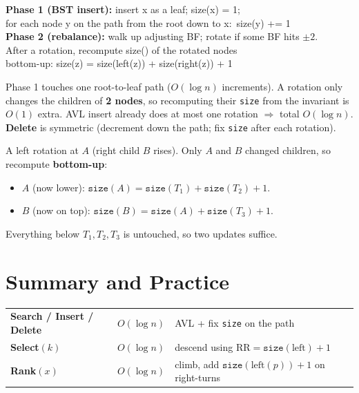 \documentclass[11pt]{article}
\begin{document}
\begin{codebox}
\ttfamily \textbf{Phase 1 (BST insert):} insert x as a leaf; size(x) = 1;\\
\ttfamily \hspace*{2em}for each node y on the path from the root down to x:\, size(y) += 1\\[3pt]
\ttfamily \textbf{Phase 2 (rebalance):} walk up adjusting BF; rotate if some BF hits $\pm 2$.\\
\ttfamily \hspace*{2em}After a rotation, recompute size() of the rotated nodes\\
\ttfamily \hspace*{2em}bottom-up: size(z) = size(left(z)) + size(right(z)) + 1
\end{codebox}

\begin{keybox}
Phase 1 touches one root-to-leaf path ($O(\log n)$ increments). A rotation only changes the children of \textbf{2 nodes}, so recomputing their \texttt{size} from the invariant is \textcolor{greenO}{$O(1)$} extra. AVL insert already does at most one rotation $\Rightarrow$ total \textcolor{violetT}{$O(\log n)$}. \textbf{Delete} is symmetric (decrement down the path; fix \texttt{size} after each rotation).
\end{keybox}

\begin{examplebox}
A left rotation at $A$ (right child $B$ rises). Only $A$ and $B$ changed children, so recompute \textbf{bottom-up}:
\begin{itemize}[leftmargin=1.4em,itemsep=1pt]
  \item $A$ (now lower): $\texttt{size}(A) = \texttt{size}(T_1) + \texttt{size}(T_2) + 1$.
  \item $B$ (now on top): $\texttt{size}(B) = \texttt{size}(A) + \texttt{size}(T_3) + 1$.
\end{itemize}
Everything below $T_1, T_2, T_3$ is untouched, so two updates suffice.
\end{examplebox}

\section{Summary and Practice}

\begin{keybox}
\renewcommand{\arraystretch}{1.35}
\begin{tabular}{l l l}
\textbf{Search / Insert / Delete} & \textcolor{violetT}{$O(\log n)$} & AVL + fix \texttt{size} on the path\\
\textbf{Select$(k)$} & \textcolor{violetT}{$O(\log n)$} & descend using $\text{RR}=\texttt{size}(\text{left})+1$\\
\textbf{Rank$(x)$} & \textcolor{violetT}{$O(\log n)$} & climb, add $\texttt{size}(\text{left}(p))+1$ on right-turns\\
\end{tabular}
\end{keybox}
\end{document}
